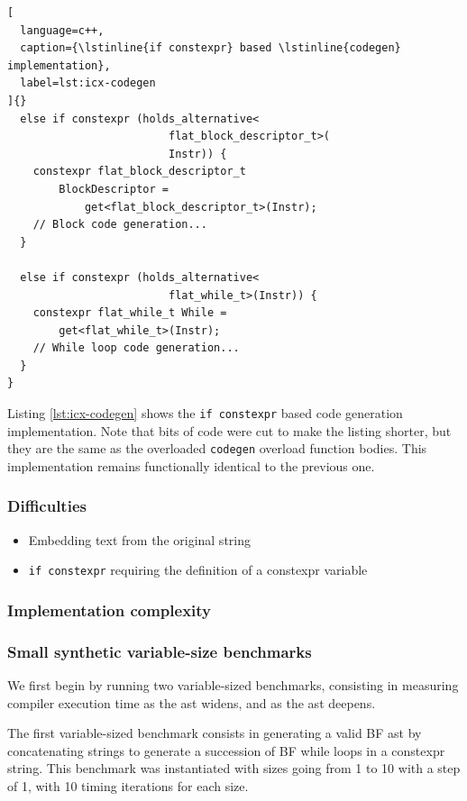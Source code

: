 \documentclass[../main]{subfiles}
\begin{document}
\begin{itemize}
\begin{lstlisting}[
  language=c++,
  caption={\lstinline{if constexpr} based \lstinline{codegen} implementation},
  label=lst:icx-codegen
]{}
  else if constexpr (holds_alternative<
                         flat_block_descriptor_t>(
                         Instr)) {
    constexpr flat_block_descriptor_t
        BlockDescriptor =
            get<flat_block_descriptor_t>(Instr);
    // Block code generation...
  }

  else if constexpr (holds_alternative<
                         flat_while_t>(Instr)) {
    constexpr flat_while_t While =
        get<flat_while_t>(Instr);
    // While loop code generation...
  }
}
\end{lstlisting}

Listing \ref{lst:icx-codegen} shows the \lstinline{if constexpr} based
code generation implementation. Note that bits of code were cut to make
the listing shorter, but they are the same as the overloaded \lstinline{codegen}
overload function bodies. This  implementation remains
functionally identical to the previous one.

\end{itemize}

\subsubsection{
  Difficulties
}

\begin{itemize}
\item Embedding text from the original string
\item \lstinline{if constexpr} requiring the definition of a \gls{constexpr} variable
\end{itemize}

\subsubsection{
  Implementation complexity
}

\subsubsection{
  Small synthetic variable-size benchmarks
}

We first begin by running two variable-sized benchmarks, consisting in
measuring compiler execution time as the \gls{ast} widens, and as the \gls{ast} deepens.

The first variable-sized benchmark consists in generating a valid BF \gls{ast} by
concatenating strings to generate a succession of BF while loops in a
\gls{constexpr} string. This benchmark was instantiated with sizes going from 1 to
10 with a step of 1, with 10 timing iterations for each size.
\end{document}
